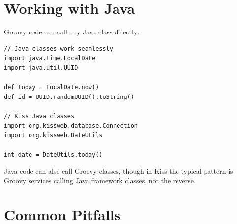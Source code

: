 \section{Working with Java}
\label{sec:gp-java-interop}

Groovy code can call any Java class directly:

\begin{lstlisting}[style=groovy]
// Java classes work seamlessly
import java.time.LocalDate
import java.util.UUID

def today = LocalDate.now()
def id = UUID.randomUUID().toString()

// Kiss Java classes
import org.kissweb.database.Connection
import org.kissweb.DateUtils

int date = DateUtils.today()
\end{lstlisting}

\noindent
Java code can also call Groovy classes, though in Kiss the typical pattern is Groovy services calling Java framework classes, not the reverse.

\section{Common Pitfalls}
\label{sec:gp-pitfalls}

